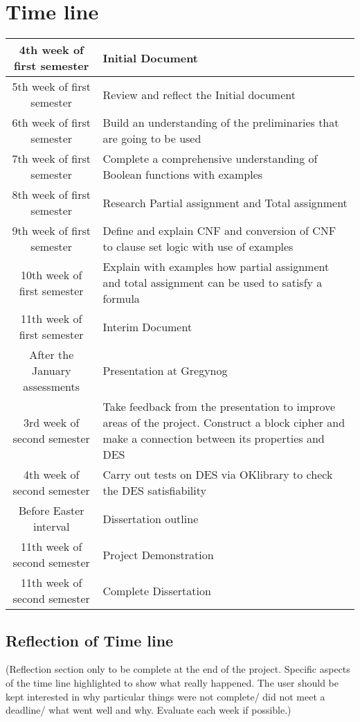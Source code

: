 \documentclass[11pt,a4paper]{report}
\begin{document}
\section{Time line}
\begin{center}
\begin{tabular}{|c|p{5cm}|}
\hline
4th week of first semester & Initial Document \\\hline
5th week of first semester & Review and reflect the Initial document\\ \hline
6th week of first semester & Build an understanding of the preliminaries that are going to be used\\ \hline
7th week of first semester & Complete a comprehensive understanding of Boolean functions with examples\\ \hline
8th week of first semester & Research Partial assignment and Total assignment \\ \hline
9th week of first semester & Define and explain CNF and conversion of CNF to clause set logic with use of examples \\ \hline
10th week of first semester & Explain with examples how partial assignment and total assignment can be used to satisfy a formula\\\hline
11th week of first semester & Interim Document\\ \hline
After the January assessments & Presentation at Gregynog\\ \hline
3rd week of second semester & Take feedback from the presentation to improve areas of the project. Construct a block cipher and make a connection between its properties and DES\\ \hline
4th week of second semester & Carry out tests on DES via OKlibrary to check the DES satisfiability\\ \hline
Before Easter interval & Dissertation outline\\ \hline
11th week of second semester & Project Demonstration\\ \hline
11th week of second semester & Complete Dissertation\\ \hline
\hline
\end{tabular}
\end{center}

\subsection{Reflection of Time line}
(Reflection section only to be complete at the end of the project. Specific aspects of the time line highlighted to show what really happened. The user should be kept interested in why particular things were not complete/ did not meet a deadline/ what went well and why. Evaluate each week if possible.)
\end{document}
